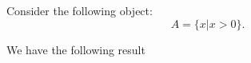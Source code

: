 \begin{definition}
	\label{def}
	Consider the following object:
	\begin{equation}
		\label{eq:def}
		A = \{ x | x > 0 \}.
	\end{equation}
\end{definition}


We have the following result

\begin{comment}
\begin{theorem}
	\label{th:commented}
	Here is our result.
\end{theorem}

\begin{proof}
	Let $x$ be an element of $A$.
	Using~\eqref{eq:def}, we have $x>0$.
\end{proof}
\end{comment}